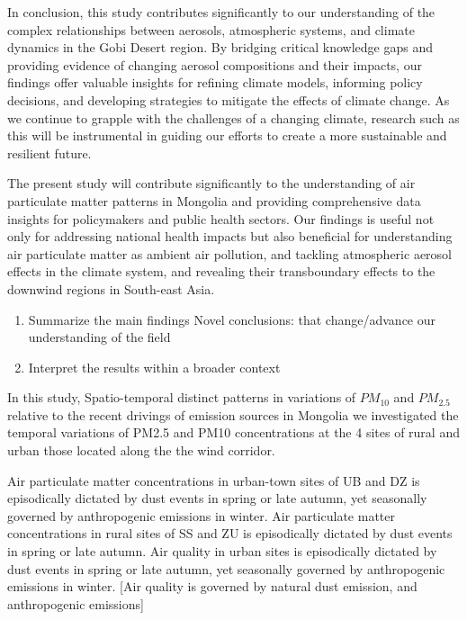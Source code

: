 \documentclass[
  11pt,
]{article}
\providecommand{\tightlist}{%
  \setlength{\itemsep}{0pt}\setlength{\parskip}{0pt}}
\begin{document}
In conclusion, this study contributes significantly to our understanding
of the complex relationships between aerosols, atmospheric systems, and
climate dynamics in the Gobi Desert region. By bridging critical
knowledge gaps and providing evidence of changing aerosol compositions
and their impacts, our findings offer valuable insights for refining
climate models, informing policy decisions, and developing strategies to
mitigate the effects of climate change. As we continue to grapple with
the challenges of a changing climate, research such as this will be
instrumental in guiding our efforts to create a more sustainable and
resilient future.

The present study will contribute significantly to the understanding of
air particulate matter patterns in Mongolia and providing comprehensive
data insights for policymakers and public health sectors. Our findings
is useful not only for addressing national health impacts but also
beneficial for understanding air particulate matter as ambient air
pollution, and tackling atmospheric aerosol effects in the climate
system, and revealing their transboundary effects to the downwind
regions in South-east Asia.

\begin{enumerate}
\def\labelenumi{\arabic{enumi}.}
\setcounter{enumi}{1}
\tightlist
\item
  Summarize the main findings Novel conclusions: that change/advance our
  understanding of the field
\item
  Interpret the results within a broader context
\end{enumerate}

In this study, Spatio-temporal distinct patterns in variations of
\(PM_{10}\) and \(PM_{2.5}\) relative to the recent drivings of emission
sources in Mongolia we investigated the temporal variations of PM2.5 and
PM10 concentrations at the 4 sites of rural and urban those located
along the the wind corridor.

Air particulate matter concentrations in urban-town sites of UB and DZ
is episodically dictated by dust events in spring or late autumn, yet
seasonally governed by anthropogenic emissions in winter. Air
particulate matter concentrations in rural sites of SS and ZU is
episodically dictated by dust events in spring or late autumn. Air
quality in urban sites is episodically dictated by dust events in spring
or late autumn, yet seasonally governed by anthropogenic emissions in
winter. {[}Air quality is governed by natural dust emission, and
anthropogenic emissions{]}
\end{document}
